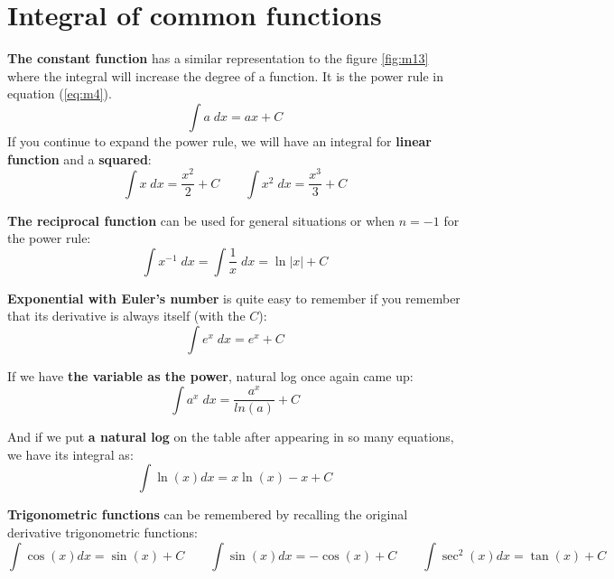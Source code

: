 \section{Integral of common functions}
\textbf{The constant function} has a similar representation to the figure \ref{fig:m13} where the integral will increase the degree of a function. It is the power rule in equation (\ref{eq:m4}).
\begin{equation}
    \int a \;dx = ax + C
\end{equation}
If you continue to expand the power rule, we will have an integral for \textbf{linear function} and a \textbf{squared}:
\begin{equation}
    \int x \;dx = \frac{x^2}{2} + C
    \qquad
    \int x^2 \;dx = \frac{x^3}{3} + C
\end{equation}

\textbf{The reciprocal function} can be used for general situations or when $n=-1$ for the power rule:
\begin{equation}
    \int x^{-1} \;dx
    = \int \frac{1}{x} \;dx
    = \ln|x| + C
\end{equation}

\textbf{Exponential with Euler's number} is quite easy to remember if you remember that its derivative is always itself (with the $C$):
\begin{equation}
    \int e^x \;dx = e^x + C
\end{equation}

If we have \textbf{the variable as the power}, natural log once again came up:
\begin{equation}
    \int a^x \;dx = \frac{a^x}{ln(a)} + C
\end{equation}

And if we put \textbf{a natural log} on the table after appearing in so many equations, we have its integral as:
\begin{equation}
    \int \ln(x)dx
    = x \ln(x) - x + C
\end{equation}

\textbf{Trigonometric functions} can be remembered by recalling the original derivative trigonometric functions:
\begin{equation}
    \int \cos(x) dx = \sin(x) + C
    \qquad
    \int \sin(x) dx = -\cos(x) + C
    \qquad
    \int \sec^2(x) dx = \tan(x) + C
\end{equation}

